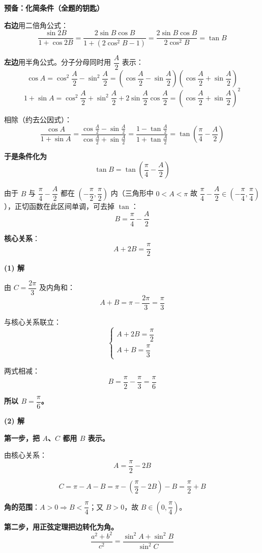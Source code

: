 \par\medskip

\textbf{预备：化简条件（全题的钥匙）}

\textbf{右边}用二倍角公式：
\[\frac{\sin2B}{1+\cos2B}=\frac{2\sin B\cos B}{1+\left(2\cos^{2}B-1\right)}=\frac{2\sin B\cos B}{2\cos^{2}B}=\tan B\]

\textbf{左边}用半角公式。分子分母同时用 $\dfrac A2$ 表示：
\[\cos A=\cos^{2}\frac A2-\sin^{2}\frac A2=\left(\cos\frac A2-\sin\frac A2\right)\left(\cos\frac A2+\sin\frac A2\right)\]
\[1+\sin A=\cos^{2}\frac A2+\sin^{2}\frac A2+2\sin\frac A2\cos\frac A2=\left(\cos\frac A2+\sin\frac A2\right)^{2}\]

相除（约去公因式）：
\[\frac{\cos A}{1+\sin A}=\frac{\cos\frac A2-\sin\frac A2}{\cos\frac A2+\sin\frac A2}=\frac{1-\tan\frac A2}{1+\tan\frac A2}=\tan\left(\frac\pi4-\frac A2\right)\]

\textbf{于是条件化为}
\[\tan B=\tan\left(\frac\pi4-\frac A2\right)\]

由于 $B$ 与 $\dfrac\pi4-\dfrac A2$ 都在 $\left(-\dfrac\pi2,\dfrac\pi2\right)$ 内（三角形中 $0<A<\pi$ 故 $\dfrac\pi4-\dfrac A2\in\left(-\dfrac\pi4,\dfrac\pi4\right)$），正切函数在此区间单调，可去掉 $\tan$：
\[B=\frac\pi4-\frac A2\]

\textbf{核心关系}：
\[\boxed{A+2B=\frac\pi2}\]

\par\medskip

\textbf{(1) 解}

由 $C=\dfrac{2\pi}3$ 及内角和：
\[A+B=\pi-\frac{2\pi}3=\frac\pi3\]

与核心关系联立：
\[\begin{cases}A+2B=\dfrac\pi2\\ A+B=\dfrac\pi3\end{cases}\]

两式相减：
\[B=\frac\pi2-\frac\pi3=\frac\pi6\]

\textbf{所以 $B=\dfrac\pi6$。}

\par\medskip

\textbf{(2) 解}

\textbf{第一步，把 $A$、$C$ 都用 $B$ 表示。}

由核心关系：
\[A=\frac\pi2-2B\]

\[C=\pi-A-B=\pi-\left(\frac\pi2-2B\right)-B=\frac\pi2+B\]

\textbf{角的范围}：$A>0\Rightarrow B<\dfrac\pi4$；又 $B>0$，故 $B\in\left(0,\dfrac\pi4\right)$。

\textbf{第二步，用正弦定理把边转化为角。}
\[\frac{a^{2}+b^{2}}{c^{2}}=\frac{\sin^{2}A+\sin^{2}B}{\sin^{2}C}\]

